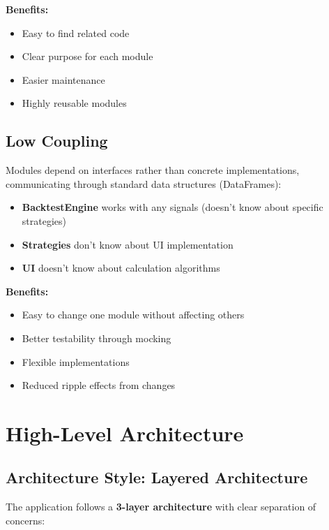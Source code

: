 \documentclass[11pt,a4paper]{article}
\begin{document}
\textbf{Benefits:}
\begin{itemize}[noitemsep]
    \item Easy to find related code
    \item Clear purpose for each module
    \item Easier maintenance
    \item Highly reusable modules
\end{itemize}

\subsection{Low Coupling}

Modules depend on interfaces rather than concrete implementations, communicating through standard data structures (DataFrames):

\begin{itemize}[noitemsep]
    \item \textbf{BacktestEngine} works with any signals (doesn't know about specific strategies)
    \item \textbf{Strategies} don't know about UI implementation
    \item \textbf{UI} doesn't know about calculation algorithms
\end{itemize}

\textbf{Benefits:}
\begin{itemize}[noitemsep]
    \item Easy to change one module without affecting others
    \item Better testability through mocking
    \item Flexible implementations
    \item Reduced ripple effects from changes
\end{itemize}

\newpage
\section{High-Level Architecture}

\subsection{Architecture Style: Layered Architecture}

The application follows a \textbf{3-layer architecture} with clear separation of concerns:
\end{document}
